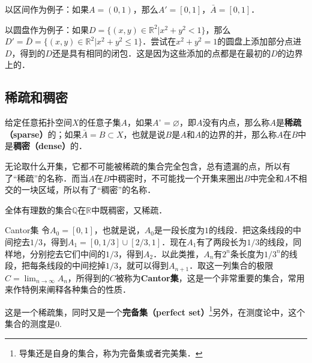 以区间作为例子：如果$A=(0,1)$，那么$A'=[0,1]$，$\bar{A}=[0,1]$．

以圆盘作为例子：如果$D=\{(x,y)\in\mathbb{R}^2|x^2+y^2<1\}$，那么$D'=\bar{D}=\{(x,y)\in\mathbb{R}^2|x^2+y^2\leq1\}$．尝试在$x^2+y^2=1$的圆盘上添加部分点进$D$，得到的$D$还是具有相同的闭包．这是因为这些添加的点都是在最初的$D$的边界上的．

\subsection{稀疏和稠密}
给定任意拓扑空间$X$的任意子集$A$，如果$A^\circ=\varnothing$，即$A$没有内点，那么称$A$是\textbf{稀疏（sparse）}的；如果$\bar{A}=B\subset X$，也就是说$B$是$A$和$A$的边界的并，那么称$A$在$B$中是\textbf{稠密（dense）}的．

无论取什么开集，它都不可能被稀疏的集合完全包含，总有遗漏的点，所以有了“稀疏”的名称．而当$A$在$B$中稠密时，不可能找一个开集来圈出$B$中完全和$A$不相交的一块区域，所以有了“稠密”的名称．

全体有理数的集合$\mathbb{Q}$在$\mathbb{R}$中既稠密，又稀疏．

\begin{example}{Cantor集}\label{Topo0_ex2}
令$A_0=[0,1]$，也就是说，$A_0$是一段长度为$1$的线段．把这条线段的中间挖去$1/3$，得到$A_1=[0,1/3]\cup[2/3,1]$．现在$A_1$有了两段长为$1/3$的线段，同样地，分别挖去它们中间的$1/3$，得到$A_2$．以此类推，$A_n$有$2^n$条长度为$1/3^n$的线段，把每条线段的中间挖掉$1/3$，就可以得到$A_{n+1}$．取这一列集合的极限$C=\lim_{n\rightarrow\infty}A_n$，所得到的$C$被称为\textbf{Cantor集}，这是一个非常重要的集合，常用来作特例来阐释各种集合的性质．

这是一个稀疏集，同时又是一个\textbf{完备集（perfect set）}\footnote{导集还是自身的集合，称为完备集或者完美集．}另外，在测度论中，这个集合的测度是0. 
\end{example}
